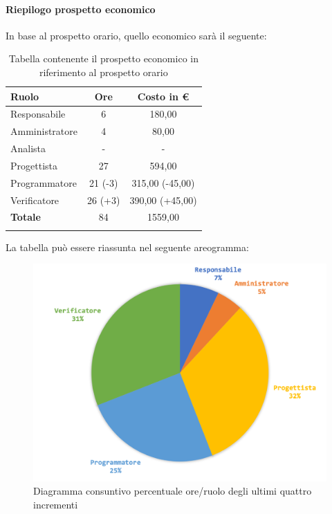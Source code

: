 		
		\paragraph{Riepilogo prospetto economico}
			In base al prospetto orario, quello economico sarà il seguente: 
			
			\begin{longtable}{|l|c|c|}
				\hline
				\rowcolor{lighter-grayer}
				\textbf{Ruolo} & \textbf{Ore} & \textbf{Costo in € } \\
				\hline
				\endfirsthead
				
				\hline
				Responsabile 	    & 6 & 180,00\\
				\hline 
				\hline
				Amministratore	   & 4 & 80,00\\
				\hline
				\hline
				Analista 				& - & -\\
				\hline
				\hline
				Progettista 		   & 27 & 594,00\\
				\hline
				\hline
				Programmatore 	  & 21 (-3)  & 315,00 (-45,00)\\
				\hline
				\hline
				Verificatore 		   & 26 (+3) & 390,00 (+45,00)\\
				\hline
				\textbf{Totale} 	 & 84 & 1559,00\\
				\hline
				\caption{Tabella contenente il prospetto economico in riferimento al prospetto orario}
			\end{longtable}
			
			La tabella può essere riassunta nel seguente areogramma:
			\begin{figure}[H]
				\centering
				\includegraphics[width=0.8\linewidth]{./images/consuntivo/ConsIncr9-12-2.png}
				\caption{Diagramma consuntivo percentuale ore/ruolo degli ultimi quattro incrementi}
				\label{ fig:diagramma consuntivo costi ruolo incrementi IX-XI I}
			\end{figure}
		\pagebreak
